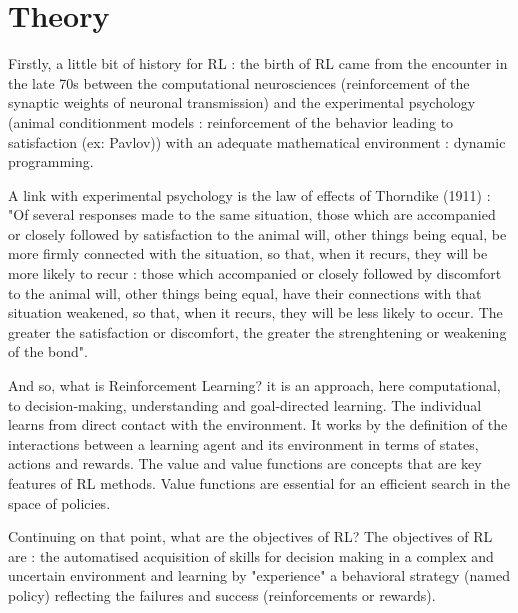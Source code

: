 \documentclass[conference]{IEEEtran}
\newlength\figureheight
\newlength\figurewidth
\begin{document}
%  

\section{Theory}
\label{sec:theory}

Firstly, a little bit of history for RL : the birth of RL came from the encounter in the late 70s between the computational neurosciences (reinforcement of the synaptic weights of neuronal transmission) and the experimental psychology (animal conditionment models : reinforcement of the behavior leading to satisfaction (ex: Pavlov)) with an adequate mathematical environment : dynamic programming.

A link with experimental psychology is the law of effects of Thorndike (1911) \cite{MUNOS1}
 : "Of several responses made to the same situation, those which are accompanied or closely followed by satisfaction to the animal will, other things being equal, be more firmly connected with the situation, so that, when it recurs, they will be more likely to recur : those which accompanied or closely followed by discomfort to the animal will, other things being equal, have their connections with that situation weakened, so that, when it recurs, they will be less likely to occur. The greater the satisfaction or discomfort, the greater the strenghtening or weakening of the bond".

And so, what is Reinforcement Learning? it is an approach, here computational, to decision-making, understanding and goal-directed learning. The individual learns from direct contact with the environment. It works by the definition of the interactions between a learning agent and its environment in terms of states, actions and rewards. The value and value functions are concepts that are key features of RL methods. Value functions are essential for an efficient search in the space of policies. 

Continuing on that point, what are the objectives of RL?
The objectives of RL are : the automatised acquisition of skills for decision making in a complex and uncertain environment and learning by "experience" a behavioral strategy (named policy) reflecting the failures and success (reinforcements or rewards).
\end{document}
